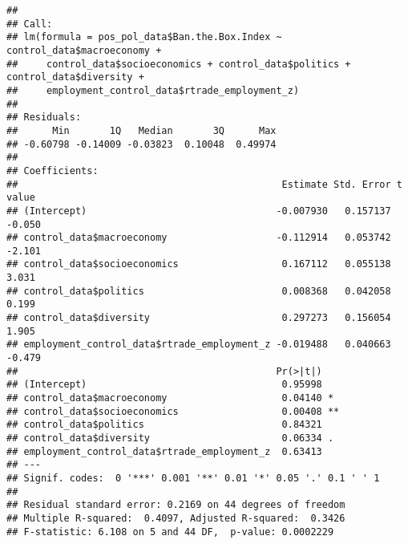 \documentclass[
]{article}
\newenvironment{Shaded}{\begin{snugshade}}{\end{snugshade}}
\newcommand{\CommentTok}[1]{\textcolor[rgb]{0.56,0.35,0.01}{\textit{#1}}}
\newcommand{\FunctionTok}[1]{\textcolor[rgb]{0.13,0.29,0.53}{\textbf{#1}}}
\newcommand{\NormalTok}[1]{#1}
\newcommand{\OtherTok}[1]{\textcolor[rgb]{0.56,0.35,0.01}{#1}}
\newcommand{\SpecialCharTok}[1]{\textcolor[rgb]{0.81,0.36,0.00}{\textbf{#1}}}
\begin{document}
\begin{Shaded}
\end{Shaded}

\begin{verbatim}
## 
## Call:
## lm(formula = pos_pol_data$Ban.the.Box.Index ~ control_data$macroeconomy + 
##     control_data$socioeconomics + control_data$politics + control_data$diversity + 
##     employment_control_data$rtrade_employment_z)
## 
## Residuals:
##      Min       1Q   Median       3Q      Max 
## -0.60798 -0.14009 -0.03823  0.10048  0.49974 
## 
## Coefficients:
##                                              Estimate Std. Error t value
## (Intercept)                                 -0.007930   0.157137  -0.050
## control_data$macroeconomy                   -0.112914   0.053742  -2.101
## control_data$socioeconomics                  0.167112   0.055138   3.031
## control_data$politics                        0.008368   0.042058   0.199
## control_data$diversity                       0.297273   0.156054   1.905
## employment_control_data$rtrade_employment_z -0.019488   0.040663  -0.479
##                                             Pr(>|t|)   
## (Intercept)                                  0.95998   
## control_data$macroeconomy                    0.04140 * 
## control_data$socioeconomics                  0.00408 **
## control_data$politics                        0.84321   
## control_data$diversity                       0.06334 . 
## employment_control_data$rtrade_employment_z  0.63413   
## ---
## Signif. codes:  0 '***' 0.001 '**' 0.01 '*' 0.05 '.' 0.1 ' ' 1
## 
## Residual standard error: 0.2169 on 44 degrees of freedom
## Multiple R-squared:  0.4097, Adjusted R-squared:  0.3426 
## F-statistic: 6.108 on 5 and 44 DF,  p-value: 0.0002229
\end{verbatim}
\end{document}
